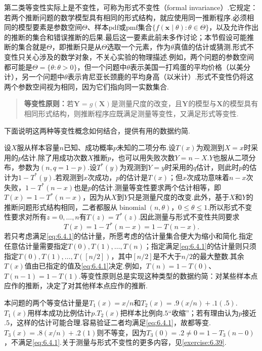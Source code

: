 第二类等变性实际上是不变性，可称为形式不变性（formal invariance）.它规定：若两个推断问题的数学模型具有相同的形式结构，就应使用同一推断程序.必须相同的模型要素是参数空间$\Theta$、样本pdf或pmf集合$\{f(\boldsymbol x\mid\theta):\theta\in\Theta\}$，以及允许作出的推断的集合和错误推断的后果.最后这一要素此前未多作讨论；本节假设可能推断的集合就是$\Theta$，即推断只是从$\Theta$选取一个元素，作为$\theta$真值的估计或猜测.形式不变性只关心涉及的数学对象，不关心实验的物理描述.例如，两个问题的参数空间都可能是$\Theta=\{\theta:\theta>0\}$，但一个问题中$\theta$表示美国一打鸡蛋的平均价格（以美分计），另一个问题中$\theta$表示肯尼亚长颈鹿的平均身高（以米计）.形式不变性仍将这两个参数空间视为相同，因为它们指向同一实数集合.
\begin{quote}
\textbf{等变性原则：}若$\boldsymbol Y=g(\boldsymbol X)$是测量尺度的改变，且$\boldsymbol Y$的模型与$\boldsymbol X$的模型具有相同形式结构，则推断程序应既满足测量等变性，又满足形式等变性.
\end{quote}
下面说明这两种等变性概念如何结合，提供有用的数据约简.
\begin{example}[二项等变性]\label{ex:6.4.1}
设$X$服从样本容量$n$已知、成功概率$p$未知的二项分布.设$T(x)$为观测到$X=x$时采用的$p$估计.除了用成功次数$X$推断$p$，也可以用失败次数$Y=n-X$.$Y$也服从二项分布，参数为$(n,q=1-p)$.设$T^*(y)$为观测到$Y=y$时采用的$q$估计，则此时$p$的估计为$1-T^*(y)$.若观测到$x$次成功，$p$的估计是$T(x)$；但$x$次成功意味着$n-x$次失败，$1-T^*(n-x)$也是$p$的估计.测量等变性要求两个估计相等，即$T(x)=1-T^*(n-x)$，因为从$X$到$Y$只是测量尺度的改变.此外，基于$X$和$Y$的推断问题形式结构相同，二者都服从$\operatorname{binomial}(n,\theta)$，$0\le\theta\le1$.所以形式不变性要求对所有$z=0,\ldots,n$有$T(z)=T^*(z)$.因此测量与形式不变性共同要求
\begin{equation}\label{eq:6.4.1}
T(x)=1-T^*(n-x)=1-T(n-x).
\end{equation}
若只考虑满足\eqref{eq:6.4.1}的估计量，所愿考虑的估计量集合便大为缩小和简化.指定任意估计量需要指定$T(0),T(1),\ldots,T(n)$；指定满足\eqref{eq:6.4.1}的估计量则只须指定$T(0),T(1),\ldots,T([n/2])$，其中$[n/2]$是不大于$n/2$的最大整数.其余$T(x)$值由已指定的值及\eqref{eq:6.4.1}决定.例如，$T(n)=1-T(0)$、$T(n-1)=1-T(1)$.等变性原则总是实现这种类型的数据约简：对某些样本点应作的推断，决定了对其他样本点应作的推断.

本问题的两个等变估计量是$T_1(x)=x/n$和$T_2(x)=.9(x/n)+.1(.5)$.$T_1(x)$用样本成功比例估计$p$.$T_2(x)$把样本比例向$.5$“收缩”；若有理由认为$p$接近$.5$，这样的估计可能合理.容易验证二者均满足\eqref{eq:6.4.1}，故都等变.$T_3(x)=.8(x/n)+.2(1)$则不等变，因为$T_3(0)=.2\ne0=1-T_3(n-0)$，不满足\eqref{eq:6.4.1}.关于测量与形式不变性的更多内容，见\autoref{exercise:6.39}.
\end{example}

